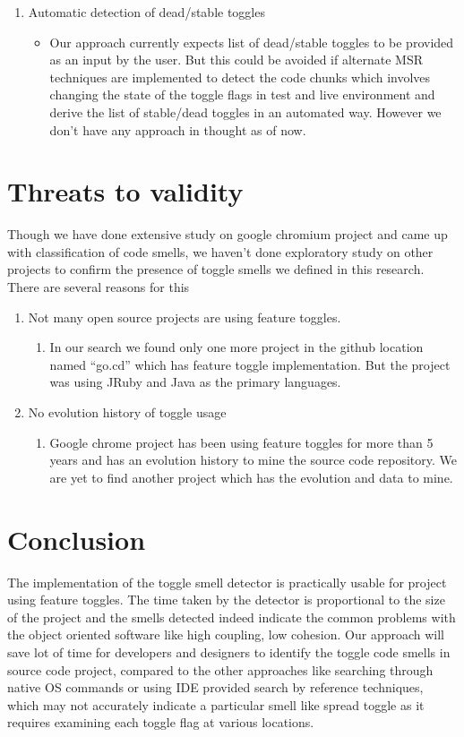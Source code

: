 \documentclass[conference]{IEEEtran}
\begin{document}
\begin{enumerate}
\item{Automatic detection of dead/stable toggles
\begin{itemize}
\item Our approach currently expects list of dead/stable toggles to be provided as an input by the user. But this could be avoided if alternate MSR techniques are implemented to detect the code chunks which involves changing the state of the toggle flags in test and live environment and derive the list of stable/dead toggles in an automated way. However we don’t have any approach in thought as of now.
\end{itemize}
}
\end{enumerate}

\section{Threats to validity}
\label{Threats to validity}

Though we have done extensive study on google chromium project and came up with classification of code smells, we haven’t done exploratory study on other projects to confirm the presence of toggle smells we defined in this research. There are several reasons for this

\begin{enumerate}
\item{Not many open source projects are using feature toggles.
\begin{enumerate}
\item In our search we found only one more project in the github location named “go.cd” which has feature toggle implementation. But the project was using JRuby and Java as the primary languages.
\end{enumerate}
}
\item {No evolution history of toggle usage
\begin{enumerate}
\item Google chrome project has been using feature toggles for more than 5 years and has an evolution history to mine the source code repository. We are yet to find another project which has the evolution and data to mine.
\end{enumerate}
}

\end{enumerate}

\section{Conclusion}
\label{conclusion}
The implementation of the toggle smell detector is practically usable for project using feature toggles. The time taken by the detector is proportional to the size of the project and the smells detected indeed indicate the common problems with the object oriented software like high coupling, low cohesion. Our approach will save lot of time for developers and designers to identify the toggle code smells in source code project, compared to the other approaches like searching through native OS commands or using IDE provided search by reference techniques, which may not accurately indicate a particular smell like spread toggle as it requires examining each toggle flag at various locations.





\balance
\end{document}
